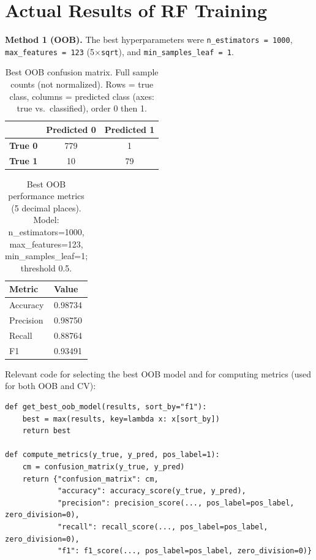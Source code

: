 \documentclass[11pt]{article}
\begin{document}
\section{Actual Results of RF Training}

\textbf{Method 1 (OOB).} The best hyperparameters were \texttt{n\_estimators = 1000}, \texttt{max\_features = 123} (5$\times$\texttt{sqrt}), and \texttt{min\_samples\_leaf = 1}.

\begin{table}[H]
\centering
\caption{Best OOB confusion matrix. Full sample counts (not normalized). Rows = true class, columns = predicted class (axes: true vs.\ classified), order 0 then 1.}
\begin{tabular}{lcc}
\toprule
 & \textbf{Predicted 0} & \textbf{Predicted 1} \\
\midrule
\textbf{True 0} & 779 & 1 \\
\textbf{True 1} & 10 & 79 \\
\bottomrule
\end{tabular}
\end{table}

\begin{table}[H]
\centering
\caption{Best OOB performance metrics (5 decimal places). Model: n\_estimators=1000, max\_features=123, min\_samples\_leaf=1; threshold 0.5.}
\begin{tabular}{ll}
\toprule
\textbf{Metric} & \textbf{Value} \\
\midrule
Accuracy & 0.98734 \\
Precision & 0.98750 \\
Recall & 0.88764 \\
F1 & 0.93491 \\
\bottomrule
\end{tabular}
\end{table}

Relevant code for selecting the best OOB model and for computing metrics (used for both OOB and CV):

\begin{lstlisting}[style=pythonstyle]
def get_best_oob_model(results, sort_by="f1"):
    best = max(results, key=lambda x: x[sort_by])
    return best

def compute_metrics(y_true, y_pred, pos_label=1):
    cm = confusion_matrix(y_true, y_pred)
    return {"confusion_matrix": cm,
            "accuracy": accuracy_score(y_true, y_pred),
            "precision": precision_score(..., pos_label=pos_label, zero_division=0),
            "recall": recall_score(..., pos_label=pos_label, zero_division=0),
            "f1": f1_score(..., pos_label=pos_label, zero_division=0)}
\end{lstlisting}
\end{document}
